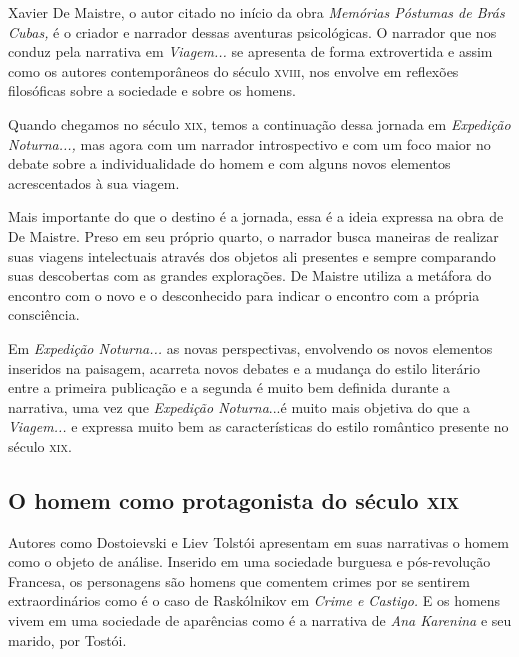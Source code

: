\documentclass[12pt]{extarticle}
\begin{document}
Xavier De Maistre, o autor citado no início da obra \emph{Memórias
Póstumas de Brás Cubas,} é o criador e narrador dessas aventuras
psicológicas. O narrador que nos conduz pela narrativa em
\emph{Viagem...} se apresenta de forma extrovertida e assim como os
autores contemporâneos do século \textsc{xviii}, nos envolve em reflexões
filosóficas sobre a sociedade e sobre os homens.




Quando chegamos no século \textsc{xix}, temos a continuação dessa jornada em
\emph{Expedição Noturna...,} mas agora com um narrador introspectivo e
com um foco maior no debate sobre a individualidade do homem e com
alguns novos elementos acrescentados à sua viagem.

Mais importante do que o destino é a jornada, essa é a ideia expressa na
obra de De Maistre. Preso em seu próprio quarto, o narrador busca
maneiras de realizar suas viagens intelectuais através dos objetos ali
presentes e sempre comparando suas descobertas com as grandes
explorações. De Maistre utiliza a metáfora do encontro com o novo e o
desconhecido para indicar o encontro com a própria consciência.




Em \emph{Expedição Noturna...} as novas perspectivas, envolvendo os
novos elementos inseridos na paisagem, acarreta novos debates e a
mudança do estilo literário entre a primeira publicação e a segunda é
muito bem definida durante a narrativa, uma vez que \emph{Expedição
Noturna}...é muito mais objetiva do que a \emph{Viagem...} e expressa
muito bem as características do estilo romântico presente no século \textsc{xix}.

\subsection{O homem como protagonista do século \textsc{xix}}

Autores como Dostoievski e Liev Tolstói apresentam em suas narrativas o
homem como o objeto de análise. Inserido em uma sociedade burguesa e
pós-revolução Francesa, os personagens são homens que comentem crimes
por se sentirem extraordinários como é o caso de Raskólnikov em
\emph{Crime e Castigo.} E os homens vivem em uma sociedade de aparências
como é a narrativa de \emph{Ana Karenina} e seu marido, por Tostói.
\end{document}
